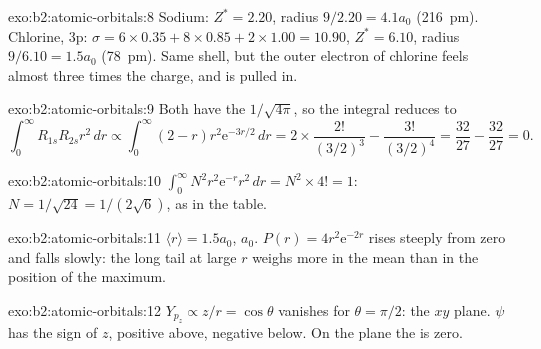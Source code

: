 \begin{solution}{exo:b2:atomic-orbitals:8}
Sodium: $Z^* = 2.20$, radius $9/2.20 = 4.1a_0$ (\qty{216}{pm}). Chlorine, 3p:
$\sigma = 6 \times 0.35 + 8 \times 0.85 + 2 \times 1.00 = 10.90$, $Z^* = 6.10$, radius
$9/6.10 = 1.5a_0$ (\qty{78}{pm}). Same shell, but the outer electron of chlorine
feels almost three times the charge, and is pulled in.
\end{solution}

\begin{solution}{exo:b2:atomic-orbitals:9}
Both have the  $1/\sqrt{4\pi}$, so the integral reduces to
\[
  \int_0^\infty R_{1s}R_{2s}r^2\,dr \propto \int_0^\infty (2 - r)r^2\mathrm e^{-3r/2}\,dr =
  2 \times \frac{2!}{(3/2)^3} - \frac{3!}{(3/2)^4} = \frac{32}{27} - \frac{32}{27} = 0 .
\]
\end{solution}

\begin{solution}{exo:b2:atomic-orbitals:10}
$\int_0^\infty N^2r^2\mathrm e^{-r}r^2\,dr = N^2 \times 4! = 1$: $N = 1/\sqrt{24} =
1/(2\sqrt6)$, as in the table.
\end{solution}

\begin{solution}{exo:b2:atomic-orbitals:11}
$\langle r\rangle = 1.5a_0$,  $a_0$. $P(r) = 4r^2\mathrm e^{-2r}$ rises
steeply from zero and falls slowly: the long tail at large $r$ weighs more in the
mean than in the position of the maximum.
\end{solution}

\begin{solution}{exo:b2:atomic-orbitals:12}
$Y_{p_z} \propto z/r = \cos\theta$ vanishes for $\theta = \pi/2$: the $xy$ plane.
$\psi$ has the sign of $z$, positive above, negative below. On the plane the
 is zero.
\end{solution}

